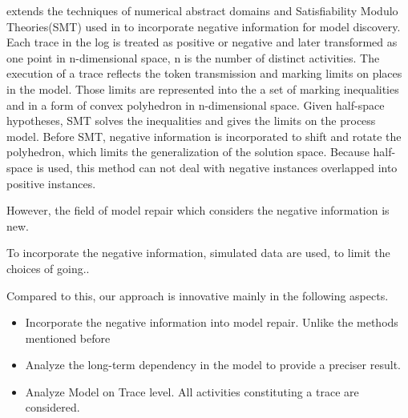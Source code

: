 \cite{ponce2016incorporating} extends the techniques of numerical abstract domains and Satisfiability Modulo Theories(SMT) used in \cite{carmona2014process} to incorporate negative information for model discovery. Each trace in the log is treated as positive or negative and later transformed as one point in n-dimensional space, n is the number of distinct activities. The execution of a trace reflects the token transmission and marking limits on places in the model. Those limits are represented into the a set of marking inequalities and in a form of convex polyhedron in n-dimensional space. Given half-space hypotheses, SMT solves the inequalities and gives the limits on the process model. Before SMT, negative information is incorporated to shift and rotate the polyhedron, which limits the generalization of the solution space. Because half-space is used, this method can not deal with negative instances overlapped into positive instances.

However, the field of model repair which considers the negative information is new. 

To incorporate the negative information, simulated data are used, to limit the choices of going..

Compared to this, our approach is innovative mainly in the following aspects. 
\begin{itemize}
	\item Incorporate the negative information into model repair. Unlike the methods mentioned before
	\item Analyze the long-term dependency in the model to provide a preciser result. 
	\item Analyze Model on Trace level. All activities constituting a trace are considered. 
\end{itemize}